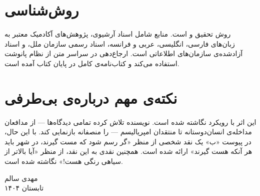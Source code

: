 \section*{روش‌شناسی}

روش تحقیق  و  است. منابع شامل اسناد آرشیوی، پژوهش‌های آکادمیک معتبر به زبان‌های فارسی، انگلیسی، عربی و فرانسه، اسناد رسمی سازمان ملل، و اسناد آزادشده‌ی سازمان‌های اطلاعاتی است. ارجاع‌دهی در سراسر متن از نظام پانوشت استفاده می‌کند و کتاب‌نامه‌ی کامل در پایان کتاب آمده است.

\section*{نکته‌ی مهم درباره‌ی بی‌طرفی}

این اثر با رویکرد  نگاشته شده است. نویسنده تلاش کرده تمامی دیدگاه‌ها — از مدافعان مداخله‌ی انسان‌دوستانه تا منتقدان امپریالیسم — را منصفانه بازنمایی کند. با این حال، در پیوست «ب» یک نقد شخصی از منظر «گر رسم شود که مست گیرند، در شهر باید هر آنکه هست گیرند» ارائه شده است. همچنین نقدی به این نقد، از منظر «آیا بالاتر از سیاهی رنگی هست!» نگاشته شده است. 

\vspace{1cm}
\begin{flushleft}
  مهدی سالم\\
  تابستان ۱۴۰۴
\end{flushleft}

\cleardoublepage